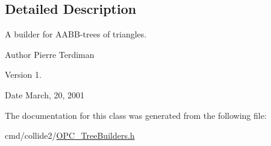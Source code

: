 \subsection{Detailed Description}
A builder for A\+A\+B\+B-\/trees of triangles.

\begin{DoxyAuthor}{Author}
Pierre Terdiman 
\end{DoxyAuthor}
\begin{DoxyVersion}{Version}
1. 
\end{DoxyVersion}
\begin{DoxyDate}{Date}
March, 20, 2001 
\end{DoxyDate}


The documentation for this class was generated from the following file\+:\begin{DoxyCompactItemize}
\item 
cmd/collide2/\hyperlink{OPC__TreeBuilders_8h}{O\+P\+C\+\_\+\+Tree\+Builders.\+h}\end{DoxyCompactItemize}
